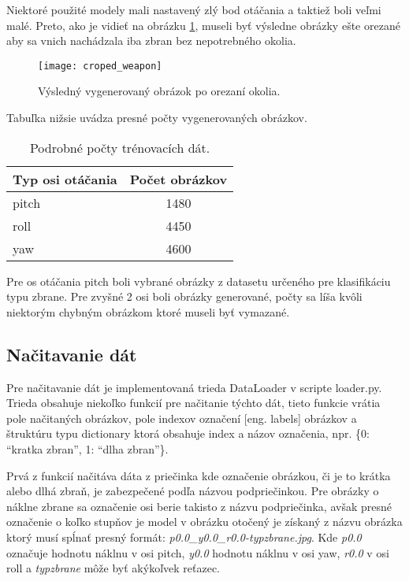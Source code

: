 Niektoré použité modely mali nastavený zlý bod otáčania a taktiež boli veľmi malé.
Preto, ako je vidieť na obrázku \ref{pic:generator3d}, museli byť výsledne obrázky ešte orezané aby sa vnich nachádzala iba zbran bez nepotrebného okolia.

\begin{figure}[H]
    \centering
    \texttt{[image: croped\_weapon]}
    \caption{Výsledný vygenerovaný obrázok po orezaní okolia.}
    \label{pic:generator3d}
\end{figure}

Tabuľka nižsie uvádza presné počty vygenerovaných obrázkov.

\begin{table}[H]
    \centering
    \label{my-label}
    \begin{tabular}{|l|c|}
        \hline
        Typ osi otáčania & \multicolumn{1}{l|}{Počet obrázkov} \\ \hline
        pitch            & 1480                                \\ \hline
        roll             & 4450                                \\ \hline
        yaw              & 4600                                \\ \hline
        \end{tabular}
    \caption{Podrobné počty trénovacích dát.}
\end{table}

Pre os otáčania pitch boli vybrané obrázky z datasetu určeného pre klasifikáciu typu zbrane.
Pre zvyšné 2 osi boli obrázky generované, počty sa líša kvôli niektorým chybným obrázkom ktoré museli byť vymazané.

\subsection{Načitavanie dát}
\label{subsec:nacitaniedat}
Pre načitavanie dát je implementovaná trieda DataLoader v scripte loader.py.
Trieda obsahuje niekoľko funkcií pre načitanie týchto dát, tieto funkcie vrátia pole načitaných obrázkov, pole indexov označení [eng. labels] obrázkov a
    štruktúru typu dictionary ktorá obsahuje index a názov označenia, npr. \{0: ``kratka zbran'', 1: ``dlha zbran''\}.

Prvá z funkcií načitáva dáta z priečinka kde označenie obrázkou, či je to krátka alebo dlhá zbraň, je zabezpečené podľa názvou podpriečinkou.
Pre obrázky o náklne zbrane sa označenie osi berie takisto z názvu podpriečinka, avšak presné označenie o koľko stupňov je model v obrázku otočený
    je získaný z názvu obrázka ktorý musí spĺnať presný formát: \textit{p0.0\_y0.0\_r0.0-typzbrane.jpg}.
Kde \textit{p0.0} označuje hodnotu náklnu v osi pitch, \textit{y0.0} hodnotu náklnu v osi yaw, \textit{r0.0} v osi roll a \textit{typzbrane} môže byť
    akýkoľvek reťazec.

